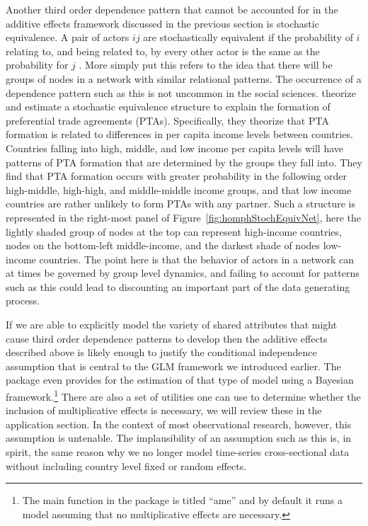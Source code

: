 Another third order dependence pattern that cannot be accounted for in the additive effects framework discussed in the previous section is stochastic equivalence. A pair of actors $ij$ are stochastically equivalent if the probability of $i$ relating to, and being related to, by every other actor is the same as the probability for $j$ \citep{anderson:etal:1992}. More simply put this refers to the idea that there will be groups of nodes in a network with similar relational patterns. The occurrence of a dependence pattern such as this is not uncommon in the social sciences. \citet{manger:etal:2012} theorize and estimate a stochastic equivalence structure to explain the formation of preferential trade agreements (PTAs). Specifically, they theorize that PTA formation is related to differences in per capita income levels between countries. Countries falling into high, middle, and low income per capita levels will have patterns of PTA formation that are determined by the groups they fall into. They find that PTA formation occurs with greater probability in the following order high-middle, high-high, and middle-middle income groups, and that low income countries are rather unlikely to form PTAs with any partner. Such a structure is represented in the right-most panel of Figure~\ref{fig:homphStochEquivNet}, here the lightly shaded group of nodes at the top can represent high-income countries, nodes on the bottom-left middle-income, and the darkest shade of nodes low-income countries. The point here is that the behavior of actors in a network can at times be governed by group level dynamics, and failing to account for patterns such as this could lead to discounting an important part of the data generating process. 

If we are able to explicitly model the variety of shared attributes that might cause third order dependence patterns to develop then the additive effects described above is likely enough to justify the conditional independence assumption that is central to the GLM framework we introduced earlier. The  package even provides for the estimation of that type of model using a Bayesian framework.\footnote{The main function in the  package is titled ``ame'' and by default it runs a model assuming that no multiplicative effects are necessary.} There are also a set of utilities one can use to determine whether the inclusion of multiplicative effects is necessary, we will review these in the application section. In the context of most observational research, however, this assumption is untenable. The implausibility of an assumption such as this is, in spirit, the same reason why we no longer model time-series cross-sectional data without including country level fixed or random effects.

